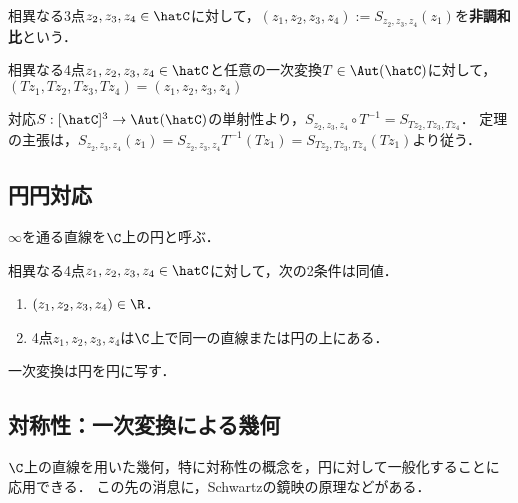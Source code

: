 \documentclass[uplatex, dvipdfmx]{jsreport}
\begin{document}
\begin{definition}
    相異なる3点$z_2,z_3,z_4\in\hatC$に対して，$(z_1,z_2,z_3,z_4):=S_{z_2,z_3,z_4}(z_1)$を\textbf{非調和比}という．
\end{definition}

\begin{theorem}
    相異なる4点$z_1,z_2,z_3,z_4\in\hatC$と任意の一次変換$T\in\Aut(\hatC)$に対して，$(Tz_1,Tz_2,Tz_3,Tz_4)=(z_1,z_2,z_3,z_4)$
\end{theorem}
\begin{Proof}
    対応$S:[\hatC]^3\to\Aut(\hatC)$の単射性より，$S_{z_2,z_3,z_4}\circ T^{-1}=S_{Tz_2,Tz_3,Tz_4}$．
    定理の主張は，$S_{z_2,z_3,z_4}(z_1)=S_{z_2,z_3,z_4}T^{-1}(Tz_1)=S_{Tz_2,Tz_3,Tz_4}(Tz_1)$より従う．
\end{Proof}

\subsection{円円対応}

\begin{notation}
    $\infty$を通る直線を$\C$上の円と呼ぶ．
\end{notation}

\begin{theorem}
    相異なる4点$z_1,z_2,z_3,z_4\in\hatC$に対して，次の2条件は同値．
    \begin{enumerate}
        \item $(z_1,z_2,z_3,z_4)\in\R$．
        \item 4点$z_1,z_2,z_3,z_4$は$\C$上で同一の直線または円の上にある．
    \end{enumerate}
\end{theorem}

\begin{corollary}
    一次変換は円を円に写す．
\end{corollary}

\subsection{対称性：一次変換による幾何}

\begin{tcolorbox}[colframe=ForestGreen, colback=ForestGreen!10!white,breakable,colbacktitle=ForestGreen!40!white,coltitle=black,fonttitle=\bfseries\sffamily,
title=]
    $\C$上の直線を用いた幾何，特に対称性の概念を，円に対して一般化することに応用できる．
    この先の消息に，Schwartzの鏡映の原理などがある．
\end{tcolorbox}
\end{document}
